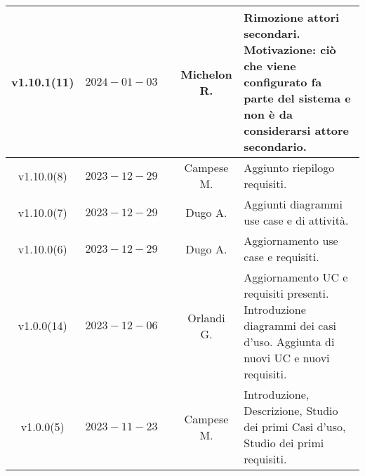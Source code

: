 {\begin{xltabular}{\textwidth}{c|c|c|c|X}
\hline
v1.10.1(11) & $2024-01-03$ &  & Michelon R. & Rimozione attori secondari. Motivazione: ciò che viene configurato fa parte del sistema e non è da considerarsi attore secondario.\\
\hline
v1.10.0(8) & $2023-12-29$ &  & Campese M. & Aggiunto riepilogo requisiti.\\
\hline
v1.10.0(7) & $2023-12-29$ &  & Dugo A. & Aggiunti diagrammi use case e di attività.\\
\hline
v1.10.0(6) & $2023-12-29$ &  & Dugo A. & Aggiornamento use case e requisiti.\\
\hline
v1.0.0(14) & $2023-12-06$ &  & Orlandi G. & Aggiornamento UC e requisiti presenti. Introduzione diagrammi dei casi d'uso. Aggiunta di nuovi UC e nuovi requisiti.\\
\hline
v1.0.0(5) & $2023-11-23$ &  & Campese M. & Introduzione, Descrizione, Studio dei primi Casi d'uso, Studio dei primi requisiti.\\

    
\end{xltabular}}